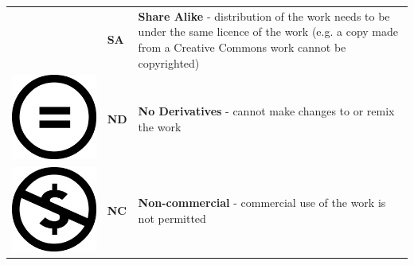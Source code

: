 \begin{table}[]
\begin{tabular}{ p{1cm} p{1cm} p{10cm}}
\begin{minipage}{.1\textwidth}
    \end{minipage} & \textbf{SA} & \textbf{Share Alike} - distribution of the work needs to be under the same licence of the work (e.g. a copy made from a Creative Commons work cannot be copyrighted) 
    \\
 \begin{minipage}{.1\textwidth}
      \includegraphics[scale=.07]{images/cc_nd.png}
    \end{minipage} & \textbf{ND} & \textbf{No Derivatives} - cannot make changes to or remix the work                                                                                                    \\
 \begin{minipage}{.1\textwidth}
      \includegraphics[scale=.07]{images/cc_nc.png}
    \end{minipage} & \textbf{NC} & \textbf{Non-commercial} - commercial use of the work is not permitted                                                                                               
\end{tabular}
\end{table}

